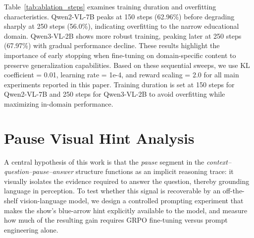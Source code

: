 \documentclass{article}
\begin{document}
Table~\ref{tab:ablation_steps} examines training duration and overfitting characteristics. Qwen2-VL-7B peaks at 150 steps (62.96\%) before degrading sharply at 250 steps (56.0\%), indicating overfitting to the narrow educational domain. Qwen3-VL-2B shows more robust training, peaking later at 250 steps (67.97\%) with gradual performance decline. These results highlight the importance of early stopping when fine-tuning on domain-specific content to preserve generalization capabilities.
\ablationtrainingsteps
Based on these sequential sweeps, we use KL coefficient = 0.01, learning rate = 1e-4, and reward scaling = 2.0 for all main experiments reported in this paper. Training duration is set at 150 steps for Qwen2-VL-7B and 250 steps for Qwen3-VL-2B to avoid overfitting while maximizing in-domain performance.




\section{Pause Visual Hint Analysis}
\label{sec:pause_hint}

A central hypothesis of this work is that the \textit{pause} segment in the
\textit{context--question--pause--answer} structure functions as an implicit reasoning
trace: it visually isolates the evidence required to answer the question, thereby
grounding language in perception.
To test whether this signal is recoverable by an off-the-shelf vision-language model,
we design a controlled prompting experiment that makes the show's blue-arrow hint
explicitly available to the model, and measure how much of the resulting gain requires
GRPO fine-tuning versus prompt engineering alone.
\end{document}
